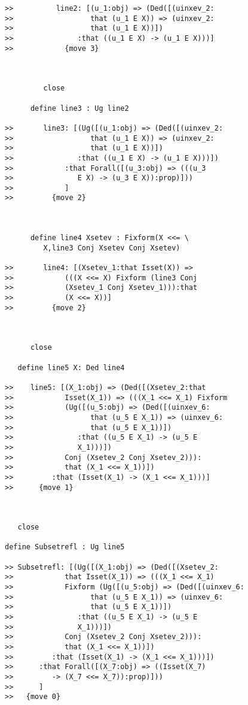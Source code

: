 \documentclass[12pt]{article}
\begin{document}
\begin{verbatim}
>>          line2: [(u_1:obj) => (Ded([(uinxev_2:
>>                  that (u_1 E X)) => (uinxev_2:
>>                  that (u_1 E X))])
>>               :that ((u_1 E X) -> (u_1 E X)))]
>>            {move 3}



         close

      define line3 : Ug line2

>>       line3: [(Ug([(u_1:obj) => (Ded([(uinxev_2:
>>                  that (u_1 E X)) => (uinxev_2:
>>                  that (u_1 E X))])
>>               :that ((u_1 E X) -> (u_1 E X)))])
>>            :that Forall([(u_3:obj) => (((u_3
>>               E X) -> (u_3 E X)):prop)]))
>>            ]
>>         {move 2}



      define line4 Xsetev : Fixform(X <<= \
         X,line3 Conj Xsetev Conj Xsetev)

>>       line4: [(Xsetev_1:that Isset(X)) =>
>>            (((X <<= X) Fixform (line3 Conj
>>            (Xsetev_1 Conj Xsetev_1))):that
>>            (X <<= X))]
>>         {move 2}



      close

   define line5 X: Ded line4

>>    line5: [(X_1:obj) => (Ded([(Xsetev_2:that
>>            Isset(X_1)) => (((X_1 <<= X_1) Fixform
>>            (Ug([(u_5:obj) => (Ded([(uinxev_6:
>>                  that (u_5 E X_1)) => (uinxev_6:
>>                  that (u_5 E X_1))])
>>               :that ((u_5 E X_1) -> (u_5 E
>>               X_1)))])
>>            Conj (Xsetev_2 Conj Xsetev_2))):
>>            that (X_1 <<= X_1))])
>>         :that (Isset(X_1) -> (X_1 <<= X_1)))]
>>      {move 1}



   close

define Subsetrefl : Ug line5

>> Subsetrefl: [(Ug([(X_1:obj) => (Ded([(Xsetev_2:
>>            that Isset(X_1)) => (((X_1 <<= X_1)
>>            Fixform (Ug([(u_5:obj) => (Ded([(uinxev_6:
>>                  that (u_5 E X_1)) => (uinxev_6:
>>                  that (u_5 E X_1))])
>>               :that ((u_5 E X_1) -> (u_5 E
>>               X_1)))])
>>            Conj (Xsetev_2 Conj Xsetev_2))):
>>            that (X_1 <<= X_1))])
>>         :that (Isset(X_1) -> (X_1 <<= X_1)))])
>>      :that Forall([(X_7:obj) => ((Isset(X_7)
>>         -> (X_7 <<= X_7)):prop)]))
>>      ]
>>   {move 0}




\end{verbatim}
\end{document}
